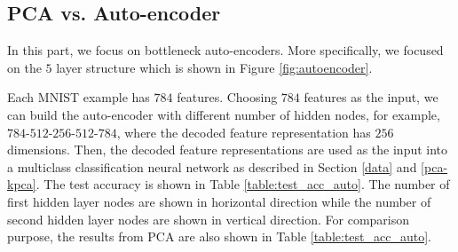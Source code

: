 \documentclass[tikz, multi,dvipsnames,svgnames,x11names]{article}
\begin{document}
\subsection{PCA vs. Auto-encoder}
\label{pca-autoencoder}

In this part, we focus on bottleneck auto-encoders. More specifically, we focused on the $5$ layer structure which is shown in Figure \ref{fig:autoencoder}.

Each MNIST example has $784$ features. Choosing $784$ features as the input, we can build the auto-encoder with different number of hidden nodes, for example, $784$-$512$-$256$-$512$-$784$, where the decoded feature representation has $256$ dimensions. Then, the decoded feature representations are used as the input into a multiclass classification neural network as described in Section \ref{data} and \ref{pca-kpca}. The test accuracy is shown in Table \ref{table:test_acc_auto}. The number of first hidden layer nodes are shown in horizontal direction while the number of second hidden layer nodes are shown in vertical direction. For comparison purpose, the results from PCA are also shown in Table \ref{table:test_acc_auto}.

\end{document}
